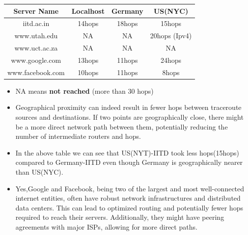 \documentclass{article}
\begin{document}
    \begin{tabular}{|c|c|c|c|}
  \hline
  \textbf{Server Name} & \textbf{Localhost} & \textbf{Germany} & \textbf{US(NYC)}\\
  \hline
  iitd.ac.in & 14hops & 18hops & 15hops \\
  \hline
   www.utah.edu & NA  & NA& 20hops (Ipv4)     \\
  \hline
   www.uct.ac.za & NA & NA & NA\\
  \hline
  www.google.com & 13hops & 11hops & 24hops \\
  \hline
  www.facebook.com & 10hops & 11hops & 8hops \\
  \hline
\end{tabular}
\begin{itemize}
    \item NA means \textbf{not reached} (more than 30 hops)
    \item Geographical proximity can indeed result in fewer hops between traceroute sources and destinations. If two points are geographically close, there might be a more direct network path between them, potentially reducing the number of intermediate routers and hops.
    \item In the above table we can see that US(NYT)-IITD took less hops(15hops) compared to Germany-IITD even though Germany is geographically nearer than US(NYC).
    \item Yes,Google and Facebook, being two of the largest and most well-connected internet entities, often have robust network infrastructures and distributed data centers. This can lead to optimized routing and potentially fewer hops required to reach their servers. Additionally, they might have peering agreements with major ISPs, allowing for more direct paths.


\end{itemize}

\subsection{}
\end{document}
